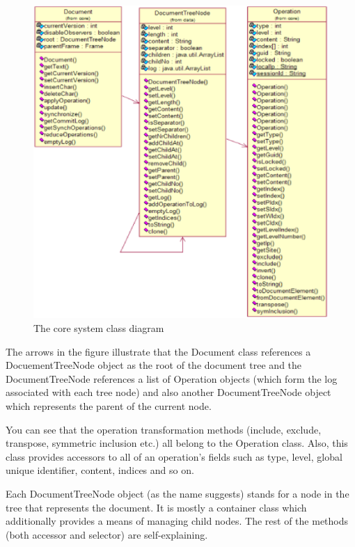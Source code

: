 \begin{figure}[htp]
\begin{center}
\includegraphics{img/CoreUML.eps}
\end{center}
\caption{The core system class diagram}
\label{fig:coreuml}
\end{figure}

The arrows in the figure illustrate that the Document class references a DocuementTreeNode
object as the root of the document tree and the DocumentTreeNode references a list of 
Operation objects (which form the log associated with each tree node) and also another
DocumentTreeNode object which represents the parent of the current node.

You can see that the operation transformation methods (include, exclude, transpose, symmetric
inclusion etc.) all belong to the Operation class. Also, this class provides accessors to
all of an operation's fields such as type, level, global unique identifier, content, indices
and so on.

Each DocumentTreeNode object (as the name suggests) stands for  a node in the tree that represents
the document. It is mostly a container class which additionally provides a means of managing
child nodes. The rest of the methods (both accessor and selector) are self-explaining.

